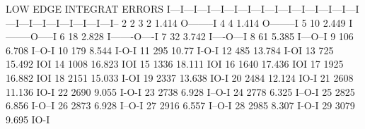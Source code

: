 \begin{Listing}
  LOW EDGE  INTEGRAT   ERRORS  I---I---I---I---I---I---I---I---I---I---I---I---I---I---I---I---I---I---I---I---I---I---I--
     2
     2
     3         2         1.414 O--------I
     4         4         1.414 O--------I
     5        10         2.449           I--------O-----I
     6        18         2.828                 I-------O----I
     7        32         3.742                             I----O---I
     8        61         5.385                                           I---O--I
     9       106         6.708                                                    I--O-I
    10       179         8.544                                                             I-O-I
    11       295        10.77                                                                      I-O-I
    12       485        13.784                                                                              I-OI
    13       725        15.492                                                                                   IOI
    14      1008        16.823                                                                                      IOI
    15      1336        18.111                                                                                        IOI
    16      1640        17.436                                                                                       IOI
    17      1925        16.882                                                                                      IOI
    18      2151        15.033                                                                                 I-OI
    19      2337        13.638                                                                              IO-I
    20      2484        12.124                                                                          IO-I
    21      2608        11.136                                                                       IO-I
    22      2690         9.055                                                               I-O-I
    23      2738         6.928                                                     I--O-I
    24      2778         6.325                                                  I--O-I
    25      2825         6.856                                                     I-O--I
    26      2873         6.928                                                     I--O-I
    27      2916         6.557                                                   I--O-I
    28      2985         8.307                                                            I-O-I
    29      3079         9.695                                                                  IO-I

\end{Listing}
